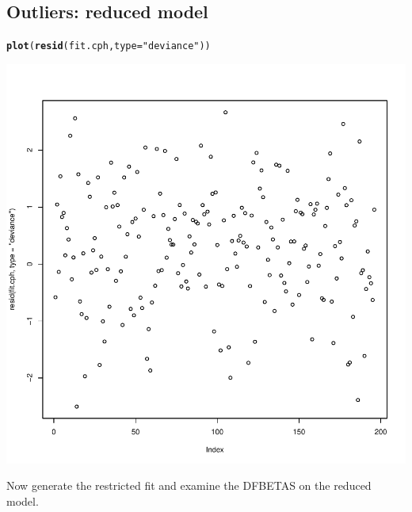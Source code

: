 \documentclass{article}\usepackage[]{graphicx}\usepackage[]{color}
\makeatletter
\def\maxwidth{ %
  \ifdim\Gin@nat@width>\linewidth
    \linewidth
  \else
    \Gin@nat@width
  \fi
}
\newcommand{\hlstr}[1]{\textcolor[rgb]{0.192,0.494,0.8}{#1}}%
\newcommand{\hlstd}[1]{\textcolor[rgb]{0.345,0.345,0.345}{#1}}%
\newcommand{\hlkwc}[1]{\textcolor[rgb]{0.333,0.667,0.333}{#1}}%
\newcommand{\hlkwd}[1]{\textcolor[rgb]{0.737,0.353,0.396}{\textbf{#1}}}%
\newenvironment{kframe}{%
 \def\at@end@of@kframe{}%
 \ifinner\ifhmode%
  \def\at@end@of@kframe{\end{minipage}}%
  \begin{minipage}{\columnwidth}%
 \fi\fi%
 \def\FrameCommand##1{\hskip\@totalleftmargin \hskip-\fboxsep
 \colorbox{shadecolor}{##1}\hskip-\fboxsep
     \hskip-\linewidth \hskip-\@totalleftmargin \hskip\columnwidth}%
 \MakeFramed {\advance\hsize-\width
   \@totalleftmargin\z@ \linewidth\hsize
   \@setminipage}}%
 {\par\unskip\endMakeFramed%
 \at@end@of@kframe}
\newenvironment{knitrout}{}{} %
\makeatother
\begin{document}
\subsection{Outliers: reduced model}
\begin{knitrout}
\color{fgcolor}\begin{kframe}
\begin{alltt}
\hlkwd{plot}\hlstd{(}\hlkwd{resid}\hlstd{(fit.cph,} \hlkwc{type} \hlstd{=} \hlstr{"deviance"}\hlstd{))}
\end{alltt}
\end{kframe}

{\centering \includegraphics[width=\maxwidth]{figure/eda-outliers-reduced-1} 

}



\end{knitrout}

Now generate the restricted fit and examine the DFBETAS on the reduced model.
\end{document}
